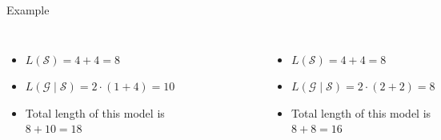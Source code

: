\documentclass[10pt]{beamer}
\begin{document}
\begin{frame}{Example}

    \begin{columns}[T, onlytextwidth]
            \begin{itemize}
                \item $L(\mathcal{S}) = 4 + 4 = 8$
                \item $L(\mathcal{G} \mid \mathcal{S}) = 2\cdot (1 + 4) = 10$
                \item Total length of this model is $8 + 10 = 18$
            \end{itemize}

        \begin{figure}
            \centering
            \includegraphics[scale=0.5]{figures/running-example/MDL/example-1.pdf}
        \end{figure}


            \begin{itemize}
                \item $L(\mathcal{S}) = 4 + 4 = 8$
                \item $L(\mathcal{G} \mid \mathcal{S}) = 2\cdot (2 + 2) = 8$
                \item Total length of this model is $8 + 8 = 16$
            \end{itemize}


\end{columns}
\end{frame}
\end{document}
